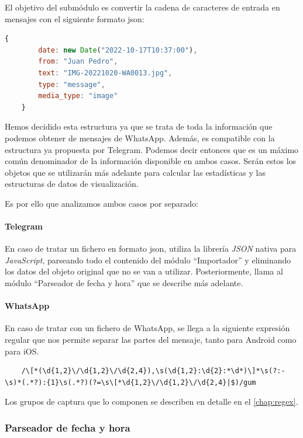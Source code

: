 El objetivo del submódulo es convertir la cadena de caracteres de entrada en mensajes con el siguiente formato \acrshort{json}:

\begin{lstlisting}[language=JavaScript]
	{
		date: new Date("2022-10-17T10:37:00"),
		from: "Juan Pedro",
		text: "IMG-20221020-WA0013.jpg",
		type: "message",
		media_type: "image"
	}
\end{lstlisting}

Hemos decidido esta estructura ya que se trata de toda la información que podemos obtener de mensajes de WhatsApp. Además, es compatible con la estructura ya propuesta por Telegram. Podemos decir entonces que es un máximo común denominador de la información disponible en ambos casos. Serán estos los objetos que se utilizarán más adelante para calcular las estadísticas y las estructuras de datos de visualización.

Es por ello que analizamos ambos casos por separado:

\paragraph{Telegram} En caso de tratar un fichero en formato \acrshort{json}, utiliza la librería \textit{JSON} nativa para \textit{JavaScript}, parseando todo el contenido del módulo ``Importador'' y eliminando los datos del objeto original que no se van a utilizar. Posteriormente, llama al módulo ``Parseador de fecha y hora'' que se describe más adelante.

\paragraph{WhatsApp} En caso de tratar con un fichero de WhatsApp, se llega a la siguiente expresión regular que nos permite separar las partes del mensaje, tanto para Android como para iOS.

\begin{lstlisting}
	/\[*(\d{1,2}\/\d{1,2}\/\d{2,4}),\s(\d{1,2}:\d{2}:*\d*)\]*\s(?:-\s)*(.*?):{1}\s(.*?)(?=\s\[*\d{1,2}\/\d{1,2}\/\d{2,4}|$)/gum
\end{lstlisting}

Los grupos de captura que lo componen se describen en detalle en el \autoref{chap:regex}.


\subsubsection{Parseador de fecha y hora}

